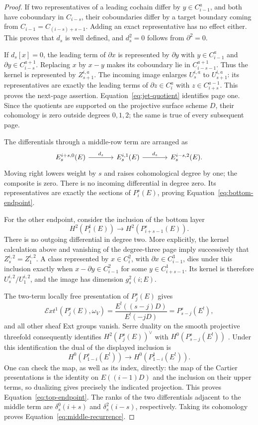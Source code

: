 \begin{proof}
If two representatives of a leading cochain differ by
$y\in C_{i-1}^a$, and both have coboundary in $C_{i-s}$, their
coboundaries differ by a target boundary coming from
$C_{i-1}=C_{(i-s)+s-1}$. Adding an exact representative has no
effect either. This proves that $d_s$ is well defined, and
$d_s^2=0$ follows from $\partial^2=0$.

If $d_s[x]=0$, the leading term of $\partial x$ is represented
by $\partial y$ with $y\in C_{i-1}^a$ and
$\partial y\in C_{i-s}^{a+1}$. Replacing $x$ by $x-y$ makes its
coboundary lie in $C_{i-s-1}^{a+1}$. Thus the kernel is represented
by $Z_{s+1}^{i,a}$. The incoming image enlarges $U_s^{i,a}$ to
$U_{s+1}^{i,a}$: its representatives are exactly the leading
terms of $\partial z\in C_i^a$ with $z\in C_{i+s}^{a-1}$.
This proves the next-page assertion. Equation~\ref{eq:jet-quotient}
identifies page one. Since the quotients are supported on the
projective surface scheme $D$, their cohomology is zero outside
degrees $0,1,2$; the same is true of every subsequent page.

The differentials through a middle-row term are arranged as
\[
 \begin{tikzcd}[column sep=large]
 E_s^{i+s,0}(E) \arrow[r,"d_s"] &
 E_s^{i,1}(E) \arrow[r,"d_s"] & E_s^{i-s,2}(E).
 \end{tikzcd}
\]
Moving right lowers weight by $s$ and raises cohomological degree
by one; the composite is zero. There is no incoming differential
in degree zero. Its representatives are exactly the sections of
$P_i^s(E)$, proving Equation~\ref{eq:bottom-endpoint}.

For the other endpoint, consider the inclusion of the bottom
layer
\[
 H^2(P_i^1(E))\longrightarrow H^2(P_{i+s-1}^s(E)).
\]
There is no outgoing differential in degree two. More explicitly,
the kernel calculation above and vanishing of the degree-three
page imply successively that $Z_s^{i,2}=Z_1^{i,2}$.
A class represented by $x\in C_i^2$, with
$\partial x\in C_{i-1}^3$, dies under this inclusion exactly when
$x-\partial y\in C_{i-1}^2$ for some
$y\in C_{i+s-1}^1$. Its kernel is therefore
$U_s^{i,2}/U_1^{i,2}$, and the image has dimension $g_s^2(i;E)$.

The two-term locally free presentation of $P_j^s(E)$ gives
\[
 \mathcal E xt^1(P_j^s(E),\omega_V)
 =\frac{E^!((s-j)D)}{E^!(-jD)}=P_{s-j}^s(E^!),
\]
and all other sheaf Ext groups vanish. Serre duality on the
smooth projective threefold consequently identifies
$H^2(P_j^s(E))^\vee$ with $H^0(P_{s-j}^s(E^!))$
\cite[Chapter~III, Section~7]{hartshorne1977}.
Under this identification the dual of the displayed inclusion is
\[
 H^0(P_{1-i}^s(E^!))\longrightarrow H^0(P_{1-i}^1(E^!)).
\]
One can check the map, as well as its index, directly: the map of
the Cartier presentations is the identity on $E((i-1)D)$ and
the inclusion on their upper terms, so dualizing gives precisely
the indicated projection. This proves Equation~\ref{eq:top-endpoint}.
The ranks of the two differentials adjacent to the middle term
are $\delta_s^0(i+s)$ and $\delta_s^2(i-s)$, respectively.
Taking its cohomology proves Equation~\ref{eq:middle-recurrence}.


\end{proof}
